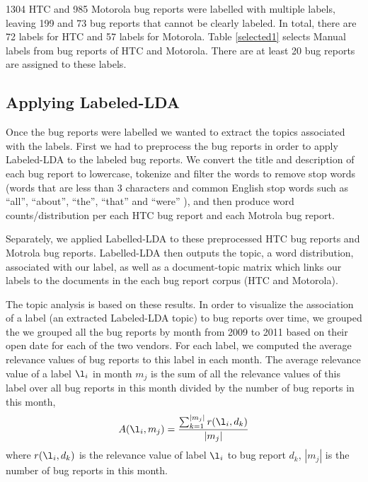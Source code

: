 \documentclass[10pt, conference, compsocconf]{IEEEtran}
\begin{document}
1304 HTC and 985 Motorola bug reports were labelled with multiple
labels, leaving 199 and 73 bug reports that cannot be clearly labeled.
In total, there are 72 labels for HTC and 57 labels for Motorola.
Table \ref{selected1} selects Manual labels from bug reports of HTC
and Motorola.  
There are at least 20 bug reports are assigned to these
labels.

\subsection{Applying Labeled-LDA}

Once the bug reports were labelled we wanted to extract the topics
associated with the labels. First we had to preprocess the bug reports 
in order to apply Labeled-LDA to the labeled bug reports. 
We convert the title and description of each bug report to lowercase,
tokenize and filter the words to remove stop words (words that are less than 3 characters and
common English stop words such as ``all'', ``about'', ``the'',
``that'' and ``were'' ), and then produce word counts/distribution per
each HTC bug report and each Motrola bug report.

Separately, we applied Labelled-LDA to these preprocessed HTC bug reports and Motrola bug reports.
Labelled-LDA then outputs the topic, a word distribution, associated
with our label, as well as a document-topic matrix which links our
labels to the documents in the each bug report corpus (HTC and
Motorola).

The topic analysis is based on these results. 
In order to visualize the association of a label (an extracted
Labeled-LDA topic) to bug reports over time, we grouped the 
we grouped
all the bug reports by month from 2009 to 2011 based on their open
date for each of the two vendors. 
For each label, we computed the average relevance values of bug
reports to this label in each month. 
The average relevance value of a label \begin{math} \l_i \end{math} in month \begin{math} m_j \end{math} is the sum of all the relevance values of this label over all bug reports in this month divided by the number of bug reports in this month,
\begin{equation}
A(\l_i,m_j) = \frac{\sum_{\substack{k=1}}^{|m_j|}r(\l_i,d_k)}{|m_j|}
\end{equation}
where $r(\l_i,d_k)$ is the relevance value of label $\l_i$ to bug
report $d_k$, $|m_j|$ is the number of bug reports in this month. 
\end{document}
